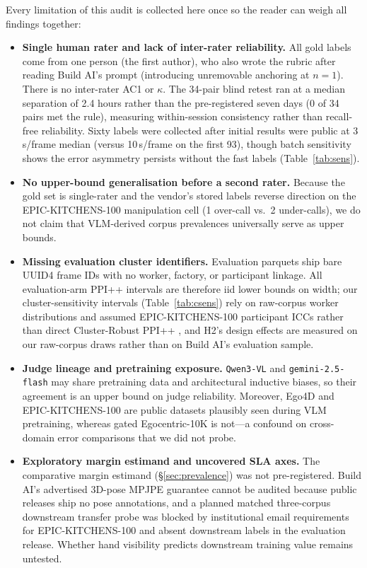 \documentclass[11pt]{article}
\begin{document}
Every limitation of this audit is collected here once so the reader can weigh all findings
together:

\begin{itemize}
\item \textbf{Single human rater and lack of inter-rater reliability.} All \vernierNPrimary{} gold
      labels come from one person (the first author), who also wrote the rubric after reading Build AI's
      prompt (introducing unremovable anchoring at $n=1$). There is no inter-rater AC1 or
      $\kappa$. The 34-pair blind retest ran at a median separation of 2.4 hours rather than the
      pre-registered seven days (0 of 34 pairs met the rule), measuring within-session consistency
      rather than recall-free reliability. Sixty labels were collected after initial results were
      public at 3\,s/frame median (versus 10\,s/frame on the first 93), though batch sensitivity
      shows the error asymmetry persists without the fast labels (Table~\ref{tab:sens}).
\item \textbf{No upper-bound generalisation before a second rater.} Because the gold set is
      single-rater and the vendor's stored labels reverse direction on the EPIC-KITCHENS-100
      manipulation cell (1 over-call vs.\ 2 under-calls), we do not claim that VLM-derived corpus
      prevalences universally serve as upper bounds.
\item \textbf{Missing evaluation cluster identifiers.} Evaluation parquets ship bare UUID4 frame
      IDs with no worker, factory, or participant linkage. All evaluation-arm PPI++ intervals are
      therefore iid lower bounds on width; our cluster-sensitivity intervals
      (Table~\ref{tab:csens}) rely on raw-corpus worker distributions and assumed EPIC-KITCHENS-100
      participant ICCs rather than direct Cluster-Robust PPI++ \citep{broska2026crppi}, and H2's
      design effects are measured on our raw-corpus draws rather than on Build AI's evaluation
      sample.
\item \textbf{Judge lineage and pretraining exposure.} \texttt{Qwen3-VL} and
      \texttt{gemini-2.5-flash} may share pretraining data and architectural inductive biases, so
      their agreement is an upper bound on judge reliability. Moreover, Ego4D and EPIC-KITCHENS-100
      are public datasets plausibly seen during VLM pretraining, whereas gated Egocentric-10K is
      not---a confound on cross-domain error comparisons that we did not probe.
\item \textbf{Exploratory margin estimand and uncovered SLA axes.} The comparative margin
      estimand (\S\ref{sec:prevalence}) was not pre-registered. Build AI's advertised 3D-pose
      MPJPE guarantee cannot be audited because public releases ship no pose annotations, and a
      planned matched three-corpus downstream transfer probe was blocked by institutional email
      requirements for EPIC-KITCHENS-100 and absent downstream labels in the evaluation release.
      Whether hand visibility predicts downstream training value remains untested.
\end{itemize}
\end{document}
